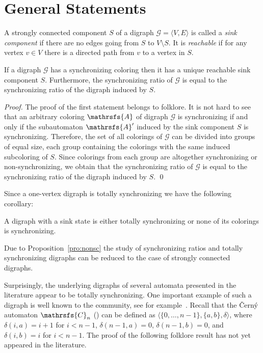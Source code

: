 \documentclass[runningheads]{llncs}
\begin{document}
\section{General Statements}

A strongly connected component $S$ of a digraph $\mathcal{G} = \langle V,E\rangle$ is called a \emph{sink component} if there are no edges going from $S$ to $V \setminus S$.
It is \emph{reachable} if for any vertex $v \in V$ there is a directed path from $v$ to a vertex in $S$.

\begin{proposition}\label{pro:nonsc}
If a digraph $\mathcal{G}$ has a synchronizing coloring then it has a unique reachable sink component $S$.
Furthermore, the synchronizing ratio of $\mathcal{G}$ is equal to the synchronizing ratio of the digraph induced by $S$.
\end{proposition}
\begin{proof}
The proof of the first statement belongs to folklore.
It is not hard to see that an arbitrary coloring $\mathrsfs{A}$ of digraph $\mathcal{G}$ is synchronizing if and only if the subautomaton $\mathrsfs{A}'$ induced by the sink component $S$ is synchronizing.
Therefore, the set of all colorings of $\mathcal{G}$ can be divided into groups of equal size, each group containing the colorings with the same induced subcoloring of $S$.
Since colorings from each group are altogether synchronizing or non-synchronizing, we obtain that the
synchronizing ratio of $\mathcal{G}$ is equal to the synchronizing ratio of the digraph induced by $S$.
\qed
\end{proof}

Since a one-vertex digraph is totally synchronizing we have the following corollary:
\begin{corollary}
A digraph with a sink state is either totally synchronizing or none of its colorings is synchronizing.
\end{corollary}

Due to Proposition~\ref{pro:nonsc} the study of synchronizing ratios and totally synchronizing digraphs can be reduced to the case of strongly connected digraphs.

Surprisingly, the underlying digraphs of several automata presented in the literature appear to be totally synchronizing. One important example of such a digraph is well known to the community, see for example~\cite{Volkov2008OpenProblemsOnSynchronizingAutomata}. Recall that the \v{C}ern\'{y} automaton $\mathrsfs{C}_n$ (\cite{Cerny1964}) can be defined as $\langle \{0,\ldots,n-1\},\{a,b\},\delta \rangle$, where $\delta(i,a)=i+1$ for $i<n-1$, $\delta(n-1,a)=0$, $\delta(n-1,b)=0$, and $\delta(i,b)=i$ for $i<n-1$. The proof of the following folklore result has not yet appeared in the literature.
\end{document}
